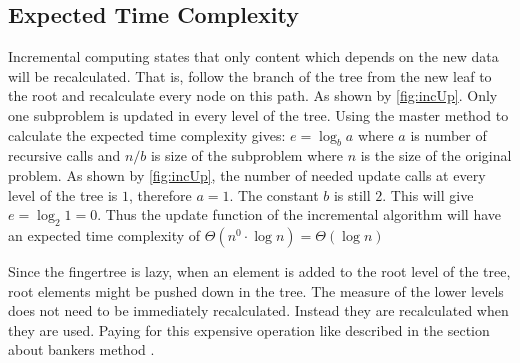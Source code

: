\subsection{Expected Time Complexity}
Incremental computing states that only content which depends on the new
data will be recalculated. That is, follow the branch of the tree from the new
leaf to the root and recalculate every node on this path. As shown by
\cref{fig:incUp}. Only one subproblem is updated in every level of the tree.
Using the master method to calculate the expected time complexity gives:
$e = \log_b a$ where $a$ is number of recursive calls and $n/b$ is size of the
subproblem where $n$ is the size of the original problem. As shown by
\cref{fig:incUp}, the number of needed update calls at every level of the tree
is $1$, therefore $a = 1$. The constant $b$ is still $2$. This will give
$e = \log_2 1 = 0$. Thus the update function of the incremental algorithm will
have an expected time complexity of $\Theta(n^0 \cdot \log n) = \Theta(\log n)$

Since the fingertree is lazy, when an element is added to the root level of the
tree, root elements might be pushed down in the tree. The measure of the
lower levels does not need to be immediately recalculated. Instead they
are recalculated when they are used. Paying for this expensive operation like
described in the section about bankers method \cite{fingertree}.
